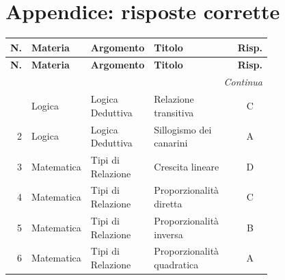 \documentclass[12pt]{article}
\begin{document}
\newpage
\section*{Appendice: risposte corrette}
\begin{longtable}{@{}r>{\raggedright\arraybackslash}p{0.14\linewidth}>{\raggedright\arraybackslash}p{0.20\linewidth}>{\raggedright\arraybackslash}p{0.42\linewidth}c@{}}
\toprule
\textbf{N.} & \textbf{Materia} & \textbf{Argomento} & \textbf{Titolo} & \textbf{Risp.} \\
\midrule
\endfirsthead
\toprule
\textbf{N.} & \textbf{Materia} & \textbf{Argomento} & \textbf{Titolo} & \textbf{Risp.} \\
\midrule
\endhead
\midrule
\multicolumn{5}{r}{\footnotesize\textit{Continua}} \\
\endfoot
\bottomrule
\endlastfoot
1 & Logica & Logica Deduttiva & Relazione transitiva & C \\
2 & Logica & Logica Deduttiva & Sillogismo dei canarini & A \\
3 & Matematica & Tipi di Relazione & Crescita lineare & D \\
4 & Matematica & Tipi di Relazione & Proporzionalità diretta & C \\
5 & Matematica & Tipi di Relazione & Proporzionalità inversa & B \\
6 & Matematica & Tipi di Relazione & Proporzionalità quadratica & A
\end{longtable}
\end{document}
